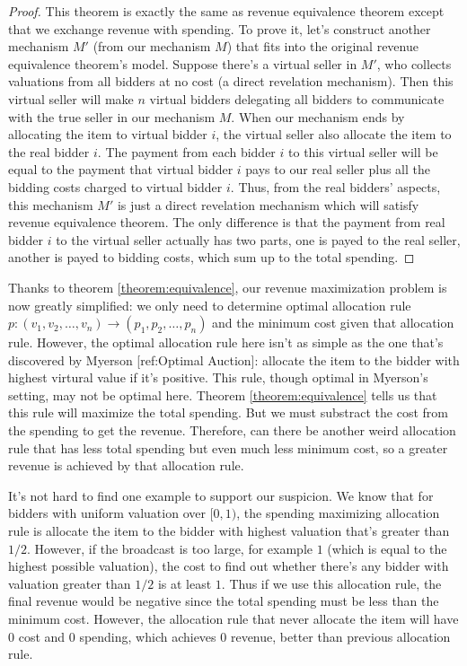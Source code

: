\begin{proof}
This theorem is exactly the same as revenue equivalence theorem except
that we exchange revenue with spending. To prove it,
let's construct another mechanism $M'$ (from our mechanism $M$) that fits into the original revenue equivalence
theorem's model. Suppose there's a virtual seller in $M'$, who collects valuations from all
bidders at no cost (a direct revelation mechanism). Then this virtual seller will
make $n$ virtual bidders delegating all bidders to communicate with the true seller in our mechanism $M$.
When our mechanism ends by allocating the item to virtual bidder $i$, the virtual seller also
allocate the item to the real bidder $i$. The payment from each bidder $i$ to this
virtual seller will be equal to the payment that virtual bidder $i$ pays to our real seller
plus all the bidding costs charged to virtual bidder $i$. Thus, from the real bidders'
aspects, this mechanism $M'$ is just a direct revelation mechanism which will satisfy
revenue equivalence theorem. The only difference is that the payment from real bidder $i$ to the virtual seller
actually has two parts, one is payed to the real seller, another is payed to bidding costs, which sum
up to the total spending.
\end{proof}

Thanks to theorem \ref{theorem:equivalence}, our revenue maximization problem
is now greatly simplified: we only need to determine optimal allocation rule
$p: (v_1, v_2, \ldots, v_n) \rightarrow (p_1, p_2, \ldots, p_n)$ and the minimum
cost given that allocation rule. However, the optimal allocation rule here
isn't as simple as the one that's discovered by Myerson [ref:Optimal Auction]:
allocate the item to the bidder with highest virtural value if it's positive.
This rule, though optimal in Myerson's setting, may not be optimal here. Theorem
\ref{theorem:equivalence} tells us that this rule will maximize the total spending.
But we must substract the cost from the spending to get the revenue. Therefore,
can there be another weird allocation rule that has less total spending but even
much less minimum cost, so a greater revenue is achieved by that allocation rule.

It's not hard to find one example to support our suspicion. We know that for bidders
with uniform valuation over $[0, 1)$, the spending maximizing allocation rule
is allocate the item to the bidder with highest valuation that's greater than $1/2$.
However, if the broadcast is too large, for example $1$ (which is equal to the
highest possible valuation), the cost to find out whether there's any bidder with valuation
greater than $1/2$ is at least $1$. Thus if we use this allocation rule, the
final revenue would be negative since the total spending must be less than the
minimum cost. However, the allocation rule that never allocate the item will have
$0$ cost and $0$ spending, which achieves $0$ revenue, better than previous allocation
rule.

